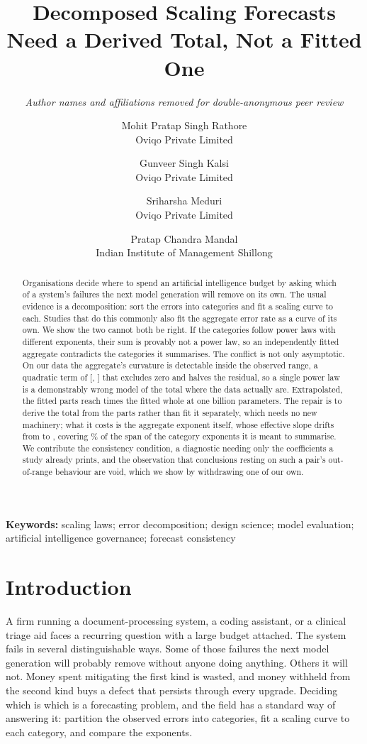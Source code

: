 \documentclass[11pt]{article}
\title{\bf Decomposed Scaling Forecasts Need a Derived Total, Not a Fitted One}
\author{\normalsize\itshape Author names and affiliations removed for
  double-anonymous peer review}
\author{
    Mohit Pratap Singh Rathore\\ \small Oviqo Private Limited
    \and
    Gunveer Singh Kalsi\\ \small Oviqo Private Limited
    \and
    Sriharsha Meduri\\ \small Oviqo Private Limited
    \and
    Pratap Chandra Mandal\\ \small Indian Institute of Management Shillong
  }
\date{}
\begin{document}
\maketitle

\begin{abstract}
Organisations decide where to spend an artificial intelligence budget by asking
which of a system's failures the next model generation will remove on its own. The
usual evidence is a decomposition: sort the errors into categories and fit a scaling
curve to each. Studies that do this commonly also fit the aggregate error rate as a
curve of its own. We show the two cannot both be right. If the categories follow
power laws with different exponents, their sum is provably not a power law, so an
independently fitted aggregate contradicts the categories it summarises. The
conflict is not only asymptotic. On our data the aggregate's curvature is
detectable inside the observed range, a quadratic term of 
[, ] that excludes zero and halves the residual, so a
single power law is a demonstrably wrong model of the total where the data actually
are. Extrapolated, the fitted parts reach  times the fitted whole
at one billion parameters. The repair is to derive the total from the parts rather
than fit it separately, which needs no new machinery; what it costs is the aggregate
exponent itself, whose effective slope drifts from  to
, covering \% of the span of the category
exponents it is meant to summarise. We contribute the consistency condition, a
diagnostic needing only the coefficients a study already prints, and the observation
that conclusions resting on such a pair's out-of-range behaviour are void, which we
show by withdrawing one of our own.
\end{abstract}

\vspace{0.5em}
\noindent\textbf{Keywords:} scaling laws; error decomposition; design science;
model evaluation; artificial intelligence governance; forecast consistency

\section{Introduction}
\label{sec:intro}

A firm running a document-processing system, a coding assistant, or a clinical
triage aid faces a recurring question with a large budget attached. The system
fails in several distinguishable ways. Some of those failures the next model
generation will probably remove without anyone doing anything. Others it will not.
Money spent mitigating the first kind is wasted, and money withheld from the second
kind buys a defect that persists through every upgrade. Deciding which is which is
a forecasting problem, and the field has a standard way of answering it: partition
the observed errors into categories, fit a scaling curve to each category, and
compare the exponents.
\end{document}
